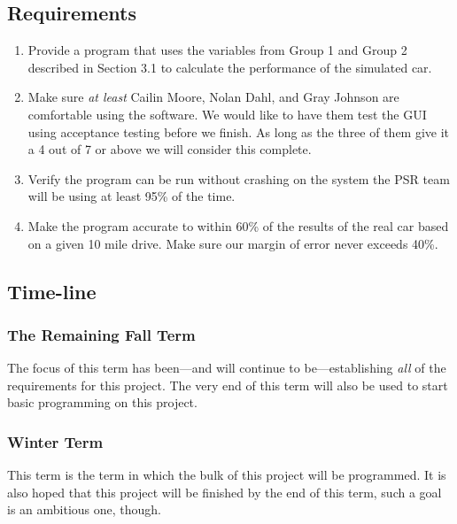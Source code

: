 \documentclass[onecolumn, draftclsnofoot,10pt, compsoc]{IEEEtran}
\begin{document}
    \subsection{Requirements}
    \begin{enumerate}
        \item Provide a program that uses the variables from Group 1 and Group 2 described in Section 3.1 to calculate the performance of the simulated car. 
        \item Make sure \textit{at least} Cailin Moore, Nolan Dahl, and Gray Johnson are comfortable using the software. We would like to have them test the GUI using acceptance testing before we finish. As long as the three of them give it a 4 out of 7 or above we will consider this complete.
        \item Verify the program can be run without crashing on the system the PSR team will be using at least 95\% of the time.
        \item Make the program accurate to within 60\% of the results of the real car based on a given 10 mile drive.
        Make sure our margin of error never exceeds 40\%.
    \end{enumerate}
    
    \subsection{Time-line}
        \subsubsection{The Remaining Fall Term}
        The focus of this term has been---and will continue to be---establishing \textit{all} of the requirements for this project. The very end of this term will also be used to start basic programming on this project.
        
        \subsubsection{Winter Term}
        This term is the term in which the bulk of this project will be programmed. It is also hoped that this project will be finished by the end of this term, such a goal is an ambitious one, though.
        
\end{document}
